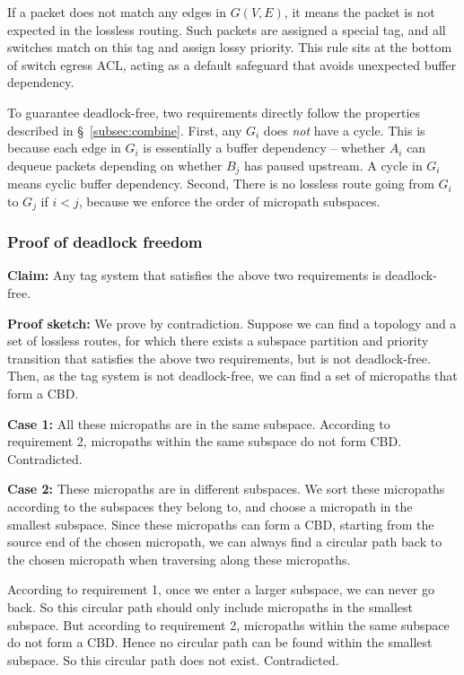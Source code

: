 If a packet does not match any edges in $G(V,E)$, it means the packet is not 
expected in the lossless routing.
Such packets are assigned a special tag, and all switches match on this tag and 
assign lossy priority. This rule sits at the bottom of switch egress ACL, acting 
as a default safeguard that avoids unexpected buffer dependency.

To guarantee deadlock-free, two requirements directly follow the properties described 
in \S~\ref{subsec:combine}. First, any $G_i$ does {\em not} have a cycle. This is 
because each edge in $G_i$ is 
essentially a buffer dependency -- whether $A_i$ can dequeue packets depending on whether
$B_j$ has paused upstream. A cycle in $G_i$ means cyclic buffer dependency.
Second, There is no lossless route going from $G_i$ to $G_j$ if $i<j$, because
we enforce the order of micropath subspaces.

\subsubsection{Proof of deadlock freedom}


\textbf{Claim:} Any tag system that satisfies the above two requirements is deadlock-free.

\textbf{Proof sketch:} We prove by contradiction. Suppose we can find a topology and a
set of lossless routes, for which there exists a subspace partition and priority
transition that satisfies the above two requirements, but is not deadlock-free.
Then, as the tag system is not deadlock-free, we can find a set of micropaths
that form a CBD. 

\textbf{Case 1:} All these micropaths are in the same subspace. According to
requirement 2, micropaths within the same subspace do not form CBD.
Contradicted.

\textbf{Case 2:} These micropaths are in different subspaces. We sort these
micropaths according to the subspaces they belong to, and choose a micropath in
the smallest subspace. Since these micropaths can form a CBD,  starting from the
source end of the chosen micropath, we can always find a circular path back to
the chosen micropath when traversing along these micropaths. 
 
According to requirement 1, once we enter a larger subspace, we can never go
back. So this circular path should only include micropaths in the smallest
subspace. But according to requirement 2, micropaths within the same subspace do
not form a CBD. Hence no circular path can be found within the smallest
subspace. So this circular path does not exist. Contradicted.
 
